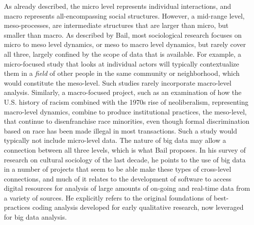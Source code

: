 \documentclass[sigconf]{acmart}
\begin{document}
As already described, the micro level represents individual interactions, and macro represents all-encompassing social structures.  However, a mid-range level, meso-processes, are intermediate structures that are larger than micro, but smaller than macro.  As described by Bail, most sociological research focuses on micro to meso level dynamics, or meso to macro level dynamics, but rarely cover all three, largely confined by the scope of data that is available. \cite{bail14} For example, a micro-focused study that looks at individual actors will typically contextualize them in a {\em field} of other people in the same community or neighborhood, which would constitute the meso-level.  Such studies rarely incorporate macro-level analysis.  Similarly, a macro-focused project, such as an examination of how the U.S. history of racism combined with the 1970s rise of neoliberalism, representing macro-level dynamics, combine to produce institutional practices, the meso-level, that continue to disenfranchise race minorities, even though formal discrimination based on race has been made illegal in most transactions.  Such a study would typically not include micro-level data.  The nature of big data may allow a connection between all three levels, which is what Bail proposes.  In his survey of research on cultural sociology of the last decade, he points to the use of big data in a number of projects that seem to be able make these types of cross-level connections, and much of it relates to the development of software to access digital resources for analysis of large amounts of on-going and real-time data from a variety of sources.  He explicitly refers to the original foundations of best-practices coding analysis developed for early qualitative research, now leveraged for big data analysis. \cite{bail14}
\end{document}
